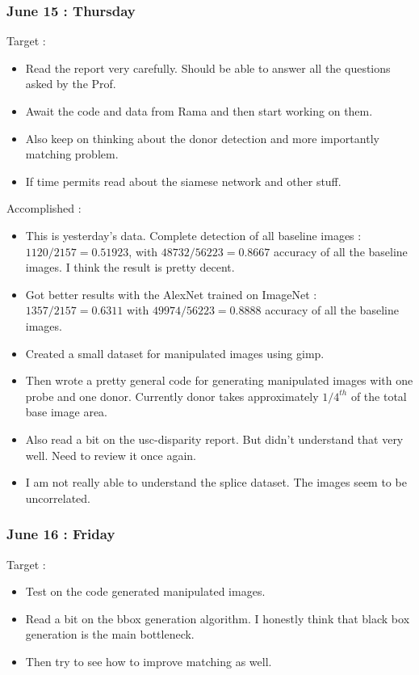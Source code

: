\documentclass{article}
\begin{document}
\subsubsection{June 15 : Thursday}
Target :
\begin{itemize}
\item Read the report very carefully. Should be able to answer all the questions asked by the Prof.
\item Await the code and data from Rama and then start working on them.
\item Also keep on thinking about the donor detection and more importantly matching problem.
\item If time permits read about the siamese network and other stuff.
\end{itemize}

Accomplished :
\begin{itemize}
\item This is yesterday's data. Complete detection of all baseline images : $1120/2157 = 0.51923$, with $48732/56223 = 0.8667$ accuracy of all the baseline images. I think the result is pretty decent.
\item Got better results with the AlexNet trained on ImageNet : $1357/2157 = 0.6311$ with $49974/56223 = 0.8888$ accuracy of all the baseline images.
\item Created a small dataset for manipulated images using gimp.
\item Then wrote a pretty general code for generating manipulated images with one probe and one donor. Currently donor takes approximately $1/4^{th}$ of the total base image area.
\item Also read a bit on the usc-disparity report. But didn't understand that very well. Need to review it once again.
\item I am not really able to understand the splice dataset. The images seem to be uncorrelated.
\end{itemize}

\subsubsection{June 16 : Friday}
Target :
\begin{itemize}
\item Test on the code generated manipulated images.
\item Read a bit on the bbox generation algorithm. I honestly think that black box generation is the main bottleneck.
\item Then try to see how to improve matching as well.
\end{itemize}
\end{document}
